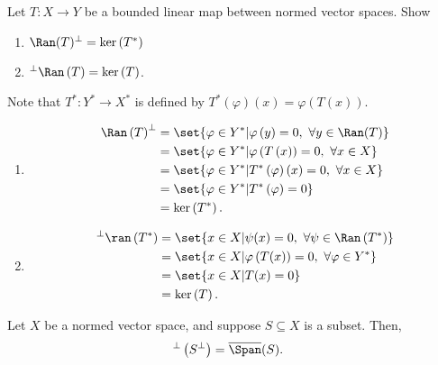 \documentclass[10pt]{mypackage}
\begin{document}
  \begin{exercise}
    Let $T: X\rightarrow Y$ be a bounded linear map between normed vector spaces. Show
    \begin{enumerate}[(1)]
      \item $\Ran(T)^{\perp} = \ker\left(T^{\ast}\right)$
      \item $^{\perp}\Ran\left(T\right) = \ker\left(T\right)$.
    \end{enumerate}
  \end{exercise}
  \begin{solution}
    Note that $T^{\ast}: Y^{\ast}\rightarrow X^{\ast}$ is defined by $T^{\ast}\left(\varphi\right)(x) = \varphi\left(T(x)\right)$.
    \begin{enumerate}[(1)]
      \item 
        \begin{align*}
          \Ran\left(T\right)^{\perp} &= \set{\varphi\in Y^{\ast}| \varphi\left(y\right) = 0,~\forall y\in \Ran(T)}\\
                                     &= \set{\varphi\in Y^{\ast}| \varphi\left(T\left(x\right)\right) = 0,~\forall x\in X}\\
                                     &= \set{\varphi\in Y^{\ast}| T^{\ast}\left(\varphi\right)(x) = 0,~\forall x\in X}\\
                                     &= \set{\varphi\in Y^{\ast}| T^{\ast}\left(\varphi\right) = 0}\\
                                     &= \ker\left(T^{\ast}\right).
        \end{align*}
      \item 
        \begin{align*}
          ^{\perp}\ran\left(T^{\ast}\right) &= \set{x\in X| \psi(x) = 0,~\forall \psi\in \Ran\left(T^{\ast}\right)}\\
                                            &= \set{x\in X| \varphi\left(T(x)\right) = 0,~\forall \varphi\in Y^{\ast}}\\
                                            &= \set{x\in X| T(x) = 0}\\
                                            &= \ker\left(T\right).
        \end{align*}
    \end{enumerate}
  \end{solution}
  \begin{corollary}
    Let $X$ be a normed vector space, and suppose $S\subseteq X$ is a subset. Then,
    \begin{align*}
      ^{\perp}\left(S^{\perp}\right) &= \overline{\Span}(S).
    \end{align*}
  \end{corollary}
\end{document}
